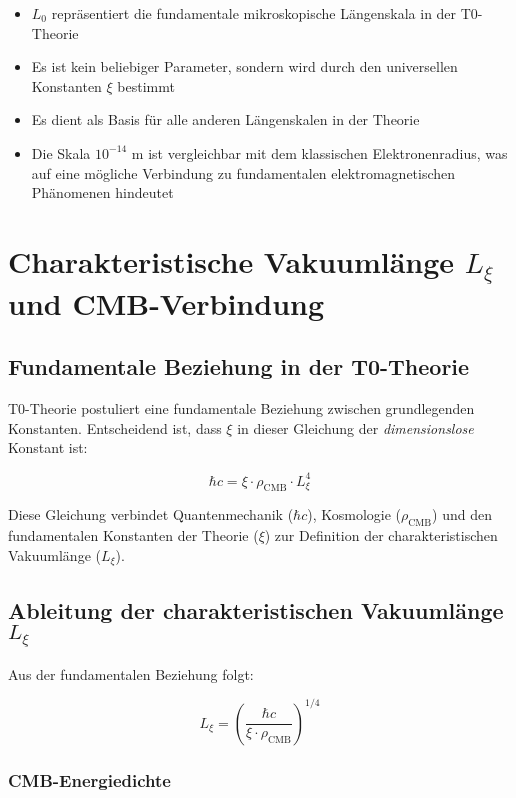 \documentclass[12pt,a4paper]{article}
\numberwithin{equation}{section}
\begin{document}
	\begin{itemize}
		\item $L_0$ repräsentiert die fundamentale mikroskopische Längenskala in der T0-Theorie
		\item Es ist kein beliebiger Parameter, sondern wird durch den universellen Konstanten $\xi$ bestimmt
		\item Es dient als Basis für alle anderen Längenskalen in der Theorie
		\item Die Skala $10^{-14}$ m ist vergleichbar mit dem klassischen Elektronenradius, was auf eine mögliche Verbindung zu fundamentalen elektromagnetischen Phänomenen hindeutet
	\end{itemize}
	
	\section{Charakteristische Vakuumlänge $L_\xi$ und CMB-Verbindung}
	
	\subsection{Fundamentale Beziehung in der T0-Theorie}
	
	T0-Theorie postuliert eine fundamentale Beziehung zwischen grundlegenden Konstanten. Entscheidend ist, dass $\xi$ in dieser Gleichung der \textit{dimensionslose} Konstant ist:
	
	\begin{formel}
		\[
		\hbar c = \xi \cdot \rho_{\text{CMB}} \cdot L_\xi^4
		\]
	\end{formel}
	
	Diese Gleichung verbindet Quantenmechanik ($\hbar c$), Kosmologie ($\rho_{\text{CMB}}$) und den fundamentalen Konstanten der Theorie ($\xi$) zur Definition der charakteristischen Vakuumlänge ($L_\xi$).
	
	\subsection{Ableitung der charakteristischen Vakuumlänge $L_\xi$}
	
	Aus der fundamentalen Beziehung folgt:
	
	\[
	L_\xi = \left(\frac{\hbar c}{\xi \cdot \rho_{\text{CMB}}}\right)^{1/4}
	\]
	
	\subsubsection{CMB-Energiedichte}
	
\end{document}
